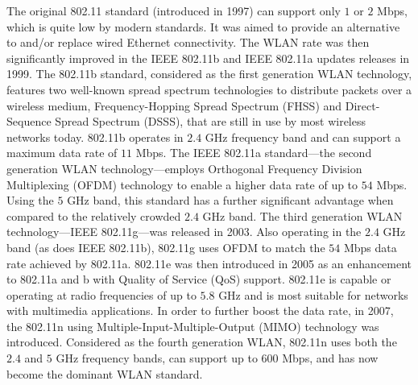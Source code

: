 The original 802.11 standard (introduced in 1997) can support only $1$ or $2$ Mbps, which is quite low by modern standards. It was aimed to provide an alternative to and/or replace wired Ethernet connectivity. The WLAN rate was then significantly improved in the IEEE 802.11b and IEEE 802.11a updates releases in 1999. The 802.11b standard, considered as the first generation WLAN technology, features two well-known spread spectrum technologies to distribute packets over a wireless medium, Frequency-Hopping Spread Spectrum (FHSS) and Direct-Sequence Spread Spectrum (DSSS), that are still in use by most wireless networks today. 802.11b operates in $2.4$ GHz frequency band and can support a maximum data rate of $11$ Mbps. The IEEE 802.11a standard---the second generation WLAN technology---employs Orthogonal Frequency Division Multiplexing (OFDM) technology to enable a higher data rate of up to $54$ Mbps. Using the $5$ GHz band, this standard has a further significant advantage when compared to the relatively crowded $2.4$ GHz band. The third generation WLAN technology---IEEE 802.11g---was released in 2003. Also operating in the $2.4$ GHz band (as does IEEE 802.11b),  802.11g uses OFDM to match the $54$ Mbps data rate achieved by 802.11a. 802.11e was then introduced in 2005 as an enhancement to 802.11a and b with Quality of Service (QoS) support. 802.11e is capable or operating at radio frequencies of up to $5.8$ GHz and is most suitable for networks with multimedia applications. In order to further boost the data rate, in 2007, the 802.11n using Multiple-Input-Multiple-Output (MIMO) technology was introduced. Considered as the fourth generation WLAN, 802.11n uses both the $2.4$ and $5$ GHz frequency bands, can support up to $600$ Mbps, and has now become the dominant WLAN standard.

